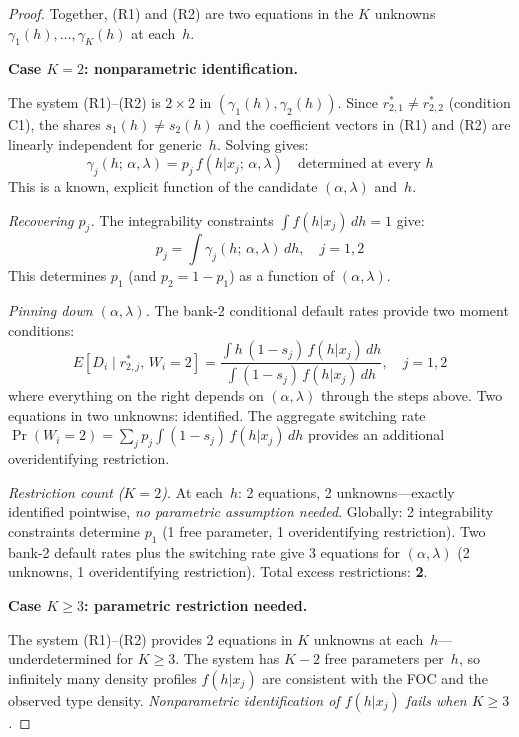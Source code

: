 \documentclass[12pt]{article}
\theoremstyle{plain}
\theoremstyle{plain}
\theoremstyle{definition}
\theoremstyle{remark}
\begin{document}
\begin{proof}
Together, (R1) and (R2) are two equations in the $K$ unknowns $\gamma_1(h), \ldots, \gamma_K(h)$ at each~$h$.

\medskip\noindent
\textbf{Case $K = 2$: nonparametric identification.}

The system (R1)--(R2) is $2 \times 2$ in $(\gamma_1(h), \gamma_2(h))$.  Since $r_{2,1}^* \neq r_{2,2}^*$ (condition C1), the shares $s_1(h) \neq s_2(h)$ and the coefficient vectors in (R1) and (R2) are linearly independent for generic~$h$.  Solving gives:
\[
    \gamma_j(h;\, \alpha, \lambda) = p_j\, f(h|x_j;\, \alpha, \lambda) \quad \text{determined at every } h
\]
This is a known, explicit function of the candidate $(\alpha, \lambda)$ and~$h$.

\medskip\noindent
\emph{Recovering $p_j$.}  The integrability constraints $\int f(h|x_j)\, dh = 1$ give:
\[
    p_j = \int \gamma_j(h;\, \alpha, \lambda)\, dh, \quad j = 1, 2
\]
This determines $p_1$ (and $p_2 = 1 - p_1$) as a function of $(\alpha, \lambda)$.

\medskip\noindent
\emph{Pinning down $(\alpha, \lambda)$.}  The bank-2 conditional default rates provide two moment conditions:
\[
    E[D_i \mid r_{2,j}^*,\, W_i = 2] = \frac{\int h\,(1 - s_j)\, f(h|x_j)\, dh}{\int (1 - s_j)\, f(h|x_j)\, dh}, \quad j = 1, 2
\]
where everything on the right depends on $(\alpha, \lambda)$ through the steps above.  Two equations in two unknowns: identified.  The aggregate switching rate $\Pr(W_i = 2) = \sum_j p_j \int (1-s_j)\, f(h|x_j)\, dh$ provides an additional overidentifying restriction.

\medskip\noindent
\emph{Restriction count ($K = 2$).}  At each~$h$: 2 equations, 2 unknowns---exactly identified pointwise, \emph{no parametric assumption needed}.  Globally: 2 integrability constraints determine $p_1$ (1 free parameter, 1 overidentifying restriction).  Two bank-2 default rates plus the switching rate give 3 equations for $(\alpha, \lambda)$ (2 unknowns, 1 overidentifying restriction).  Total excess restrictions: \textbf{2}.

\medskip\noindent
\textbf{Case $K \geq 3$: parametric restriction needed.}

The system (R1)--(R2) provides 2 equations in $K$ unknowns at each~$h$---underdetermined for $K \geq 3$.  The system has $K - 2$ free parameters per~$h$, so infinitely many density profiles $f(h|x_j)$ are consistent with the FOC and the observed type density.  \emph{Nonparametric identification of $f(h|x_j)$ fails when $K \geq 3$.}


\end{proof}
\end{document}
